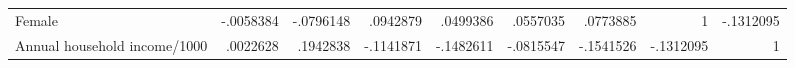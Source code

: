 \documentclass{article}
\begin{document}
\begin{table}[!h]
\begin{tabular}{lllllllll}
\multicolumn{1}{l}{Female} &
  \multicolumn{1}{|r}{-.0058384} &
  \multicolumn{1}{r}{-.0796148} &
  \multicolumn{1}{r}{.0942879} &
  \multicolumn{1}{r}{.0499386} &
  \multicolumn{1}{r}{.0557035} &
  \multicolumn{1}{r}{.0773885} &
  \multicolumn{1}{r}{1} &
  \multicolumn{1}{r}{-.1312095} \\
\multicolumn{1}{l}{Annual household income/1000} &
  \multicolumn{1}{|r}{.0022628} &
  \multicolumn{1}{r}{.1942838} &
  \multicolumn{1}{r}{-.1141871} &
  \multicolumn{1}{r}{-.1482611} &
  \multicolumn{1}{r}{-.0815547} &
  \multicolumn{1}{r}{-.1541526} &
  \multicolumn{1}{r}{-.1312095} &
  \multicolumn{1}{r}{1} \\
\cline{1-9}
\end{tabular}
\end{table}
\end{document}

